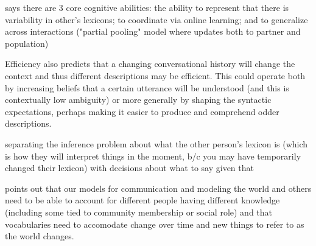 \documentclass[]{article}
\begin{document}
	\cite{hawkins2021} says there are 3 core cognitive abilities: the ability to represent that there is variability in other's lexicons; to coordinate via online learning; and to generalize across interactions ("partial pooling" model where updates both to partner and population) 

Efficiency also predicts that a changing conversational history will change the context and thus different descriptions may be efficient. This could operate both by increasing beliefs that a certain utterance will be understood (and this is contextually low ambiguity) or more generally by shaping the syntactic expectations, perhaps making it easier to produce and comprehend odder descriptions. 

\cite{hawkins2021} separating the inference problem about what the other person's lexicon is (which is how they will interpret things in the moment, b/c you may have temporarily changed their lexicon) with decisions about what to say given that 

\cite{hawkins2021} points out that our models for communication and modeling the world and others need to be able to account for different people having different knowledge (including some tied to community membership or social role) and that vocabularies need to accomodate change over time and new things to refer to as the world changes. 

\printbibliography
\end{document}
